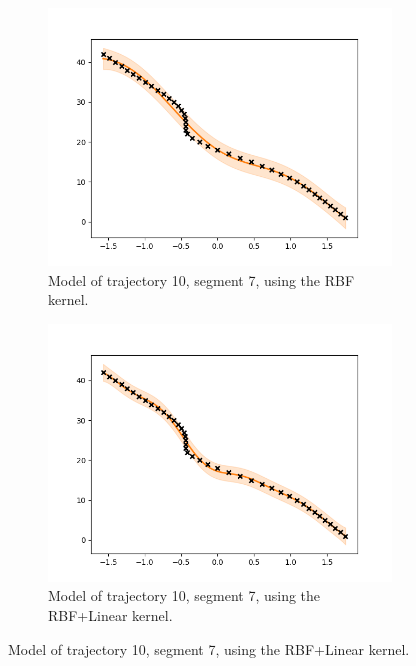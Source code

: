 \begin{figure}
    \centering
    \begin{subfigure}[b]{0.475\textwidth}
        \centering
        \includegraphics[width=\textwidth]{figures/forecasting/10_7_rbf}
        \caption[]%
        {{\small Model of trajectory 10, segment 7, using the RBF kernel.}}    
        \label{fig:10-7-rbf}
    \end{subfigure}
    \hfill
    \begin{subfigure}[b]{0.475\textwidth}  
        \centering 
        \includegraphics[width=\textwidth]{figures/forecasting/10_7_rbf_linear}
            \caption[]%
            {{\small Model of trajectory 10, segment 7, using the RBF+Linear kernel.}}    

\end{subfigure}
\end{figure}
